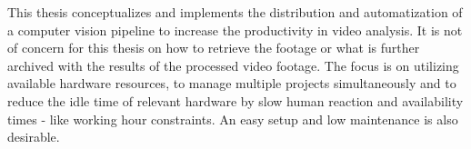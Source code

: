 This thesis conceptualizes and implements the distribution and automatization of a computer vision pipeline to increase the productivity in video analysis.
It is not of concern for this thesis on how to retrieve the footage or what is further archived with the results of the processed video footage.
The focus is on utilizing available hardware resources, to manage multiple projects simultaneously and to reduce the idle time of relevant hardware by slow human reaction and availability times - like working hour constraints.
An easy setup and low maintenance is also desirable.

